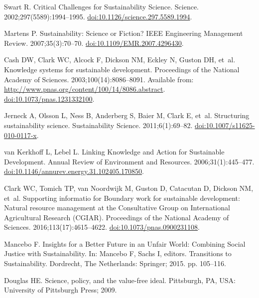 \documentclass[10pt,a4paper]{article}
\begin{document}
\begin{multicols}{2}
\begin{footnotesize}
\begin{thebibliography}{100}
Swart R.
\newblock Critical {Challenges} for {Sustainability} {Science}.
\newblock Science. 2002;297(5589):1994--1995.
\newblock
  \href{https://doi.org/10.1126/science.297.5589.1994}{doi:10.1126/science.297.5589.1994}.

Martens P.
\newblock Sustainability: {Science} or {Fiction}?
\newblock IEEE Engineering Management Review. 2007;35(3):70--70.
\newblock
  \href{https://doi.org/10.1109/EMR.2007.4296430}{doi:10.1109/EMR.2007.4296430}.

Cash DW, Clark WC, Alcock F, Dickson NM, Eckley N, Guston DH, et~al.
\newblock Knowledge systems for sustainable development.
\newblock Proceedings of the National Academy of Sciences.
  2003;100(14):8086--8091.
\newblock Available from:
  \url{http://www.pnas.org/content/100/14/8086.abstract}.
  \href{https://doi.org/10.1073/pnas.1231332100}{doi:10.1073/pnas.1231332100}.

Jerneck A, Olsson L, Ness B, Anderberg S, Baier M, Clark E, et~al.
\newblock Structuring sustainability science.
\newblock Sustainability Science. 2011;6(1):69--82.
\newblock
  \href{https://doi.org/10.1007/s11625-010-0117-x}{doi:10.1007/s11625-010-0117-x}.

van Kerkhoff L, Lebel L.
\newblock Linking {Knowledge} and {Action} for {Sustainable} {Development}.
\newblock Annual Review of Environment and Resources. 2006;31(1):445--477.
\newblock
  \href{https://doi.org/10.1146/annurev.energy.31.102405.170850}{doi:10.1146/annurev.energy.31.102405.170850}.

Clark WC, Tomich TP, van Noordwijk M, Guston D, Catacutan D, Dickson NM, et~al.
\newblock Supporting informatio for Boundary work for sustainable development:
  Natural resource management at the Consultative Group on International
  Agricultural Research (CGIAR).
\newblock Proceedings of the National Academy of Sciences.
  2016;113(17):4615--4622.
\newblock
  \href{https://doi.org/10.1073/pnas.0900231108}{doi:10.1073/pnas.0900231108}.

Mancebo F.
\newblock Insights for a {Better} {Future} in an {Unfair} {World}: {Combining}
  {Social} {Justice} with {Sustainability}.
\newblock In: Mancebo F, Sachs I, editors. Transitions to {Sustainability}.
  Dordrecht, The Netherlands: Springer; 2015. pp. 105--116.

Douglas HE.
\newblock Science, policy, and the value-free ideal.
\newblock Pittsburgh, PA, USA: University of Pittsburgh Press; 2009.


\end{thebibliography}
\end{footnotesize}
\end{multicols}
\end{document}
